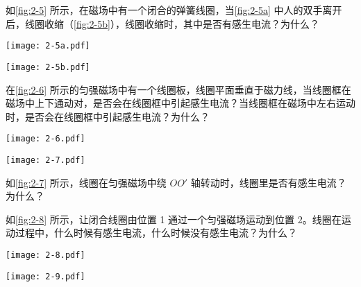 \begin{Practice}
\begin{question}
  \item 如\cref{fig:2-5} 所示，在磁场中有一个闭合的弹簧线圈，当\cref{fig:2-5a} 中人的双手离开后，线圈收缩（\cref{fig:2-5b}），线圈收缩时，其中是否有感生电流？为什么？
  \begin{figurehere}
    \begin{minipage}{\linewidth}\centering
      \nextfloat
    \begin{minipage}{0.45\linewidth}\centering
      \texttt{[image: 2-5a.pdf]}
      \subcaption{}\label{fig:2-5a}
    \end{minipage}
    \begin{minipage}{0.45\linewidth}\centering
      \texttt{[image: 2-5b.pdf]}
      \subcaption{}\label{fig:2-5b}
    \end{minipage}
    \caption{}\label{fig:2-5}
    \end{minipage}
  \end{figurehere}
  \item 在\cref{fig:2-6} 所示的匀强磁场中有一个线圈板，线圈平面垂直于磁力线，当线圈框在磁场中上下通动对，是否会在线圈框中引起感生电流？当线圈框在磁场中左右运动时，是否会在线圈框中引起感生电流？为什么？
  \begin{figurehere}
    \begin{minipage}[b]{0.48\linewidth}\centering
      \texttt{[image: 2-6.pdf]}
      \caption{}\label{fig:2-6}
    \end{minipage}
    \begin{minipage}[b]{0.48\linewidth}\centering
      \texttt{[image: 2-7.pdf]}
      \caption{}\label{fig:2-7}
    \end{minipage}
  \end{figurehere}
  \item 如\cref{fig:2-7} 所示，线圈在匀强磁场中绕 $OO'$ 轴转动时，线圈里是否有感生电流？为什么？
  \item 如\cref{fig:2-8} 所示，让闭合线圈由位置 1 通过一个匀强磁场运动到位置 2。线圈在运动过程中，什么时候有感生电流，什么时候没有感生电流？为什么？
  \begin{figurehere}
    \begin{minipage}[b]{0.48\linewidth}\centering
      \texttt{[image: 2-8.pdf]}
      \caption{}\label{fig:2-8}
    \end{minipage}
    \begin{minipage}[b]{0.48\linewidth}\centering
      \texttt{[image: 2-9.pdf]}
      \caption{}\label{fig:2-9}

\end{minipage}
\end{figurehere}
\end{question}
\end{Practice}
